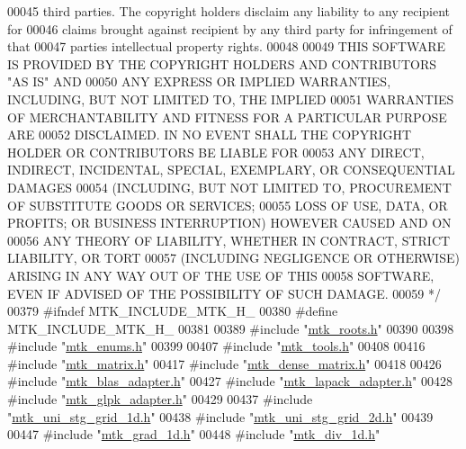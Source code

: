 \begin{DoxyCode}
00045 \textcolor{comment}{third parties. The copyright holders disclaim any liability to any recipient for}
00046 \textcolor{comment}{claims brought against recipient by any third party for infringement of that}
00047 \textcolor{comment}{parties intellectual property rights.}
00048 \textcolor{comment}{}
00049 \textcolor{comment}{THIS SOFTWARE IS PROVIDED BY THE COPYRIGHT HOLDERS AND CONTRIBUTORS "AS IS" AND}
00050 \textcolor{comment}{ANY EXPRESS OR IMPLIED WARRANTIES, INCLUDING, BUT NOT LIMITED TO, THE IMPLIED}
00051 \textcolor{comment}{WARRANTIES OF MERCHANTABILITY AND FITNESS FOR A PARTICULAR PURPOSE ARE}
00052 \textcolor{comment}{DISCLAIMED. IN NO EVENT SHALL THE COPYRIGHT HOLDER OR CONTRIBUTORS BE LIABLE FOR}
00053 \textcolor{comment}{ANY DIRECT, INDIRECT, INCIDENTAL, SPECIAL, EXEMPLARY, OR CONSEQUENTIAL DAMAGES}
00054 \textcolor{comment}{(INCLUDING, BUT NOT LIMITED TO, PROCUREMENT OF SUBSTITUTE GOODS OR SERVICES;}
00055 \textcolor{comment}{LOSS OF USE, DATA, OR PROFITS; OR BUSINESS INTERRUPTION) HOWEVER CAUSED AND ON}
00056 \textcolor{comment}{ANY THEORY OF LIABILITY, WHETHER IN CONTRACT, STRICT LIABILITY, OR TORT}
00057 \textcolor{comment}{(INCLUDING NEGLIGENCE OR OTHERWISE) ARISING IN ANY WAY OUT OF THE USE OF THIS}
00058 \textcolor{comment}{SOFTWARE, EVEN IF ADVISED OF THE POSSIBILITY OF SUCH DAMAGE.}
00059 \textcolor{comment}{*/}
00379 \textcolor{preprocessor}{#ifndef MTK\_INCLUDE\_MTK\_H\_}
00380 \textcolor{preprocessor}{#define MTK\_INCLUDE\_MTK\_H\_}
00381 
00389 \textcolor{preprocessor}{#include "\hyperlink{mtk__roots_8h}{mtk\_roots.h}"}
00390 
00398 \textcolor{preprocessor}{#include "\hyperlink{mtk__enums_8h}{mtk\_enums.h}"}
00399 
00407 \textcolor{preprocessor}{#include "\hyperlink{mtk__tools_8h}{mtk\_tools.h}"}
00408 
00416 \textcolor{preprocessor}{#include "\hyperlink{mtk__matrix_8h}{mtk\_matrix.h}"}
00417 \textcolor{preprocessor}{#include "\hyperlink{mtk__dense__matrix_8h}{mtk\_dense\_matrix.h}"}
00418 
00426 \textcolor{preprocessor}{#include "\hyperlink{mtk__blas__adapter_8h}{mtk\_blas\_adapter.h}"}
00427 \textcolor{preprocessor}{#include "\hyperlink{mtk__lapack__adapter_8h}{mtk\_lapack\_adapter.h}"}
00428 \textcolor{preprocessor}{#include "\hyperlink{mtk__glpk__adapter_8h}{mtk\_glpk\_adapter.h}"}
00429 
00437 \textcolor{preprocessor}{#include "\hyperlink{mtk__uni__stg__grid__1d_8h}{mtk\_uni\_stg\_grid\_1d.h}"}
00438 \textcolor{preprocessor}{#include "\hyperlink{mtk__uni__stg__grid__2d_8h}{mtk\_uni\_stg\_grid\_2d.h}"}
00439 
00447 \textcolor{preprocessor}{#include "\hyperlink{mtk__grad__1d_8h}{mtk\_grad\_1d.h}"}
00448 \textcolor{preprocessor}{#include "\hyperlink{mtk__div__1d_8h}{mtk\_div\_1d.h}"}

\end{DoxyCode}
